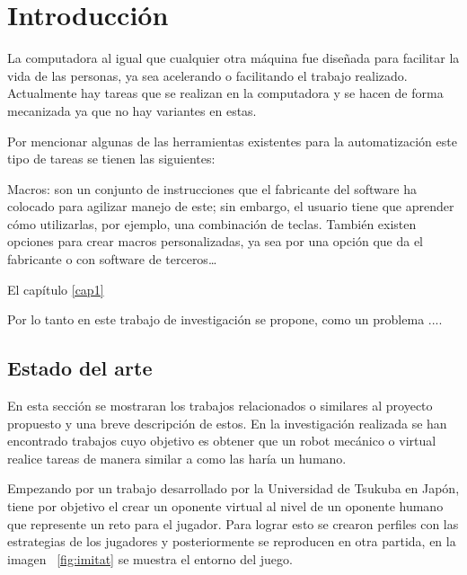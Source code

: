 \chapter{Introducción \label{cap1}}

La computadora al igual que cualquier otra máquina fue diseñada para facilitar
la vida de las personas, ya sea acelerando o facilitando el trabajo realizado.
Actualmente hay tareas que se realizan en la computadora y se hacen de forma
mecanizada ya que no hay variantes en estas. 

Por mencionar algunas de las herramientas existentes  para la automatización
este tipo de tareas se tienen las siguientes:

Macros: son un conjunto de instrucciones que el fabricante del software ha
colocado para agilizar manejo de este; sin embargo, el usuario tiene  que
aprender cómo utilizarlas, por ejemplo, una combinación de teclas. También
existen opciones para crear macros personalizadas, ya sea por una opción que
da el fabricante o con software de terceros…

El capítulo \ref{cap1} 

Por lo tanto en este trabajo de investigación se propone, como un problema ....

\section{Estado del arte}
En esta sección se mostraran los trabajos relacionados o similares al proyecto
 propuesto y una breve descripción de estos. En la investigación realizada se 
 han encontrado trabajos cuyo objetivo es obtener que un robot mecánico o
 virtual realice tareas de manera similar a como las haría un humano. 





Empezando por un trabajo desarrollado por la Universidad de Tsukuba en
 Japón\cite{Nakano2006}, tiene por objetivo el crear un oponente virtual
 al nivel de un oponente humano que represente un reto para el jugador. Para
 lograr esto se crearon perfiles con las estrategias de los jugadores y
 posteriormente se reproducen en otra partida, en la imagen ~\ref{fig:imitat}
 se muestra el entorno del juego.


